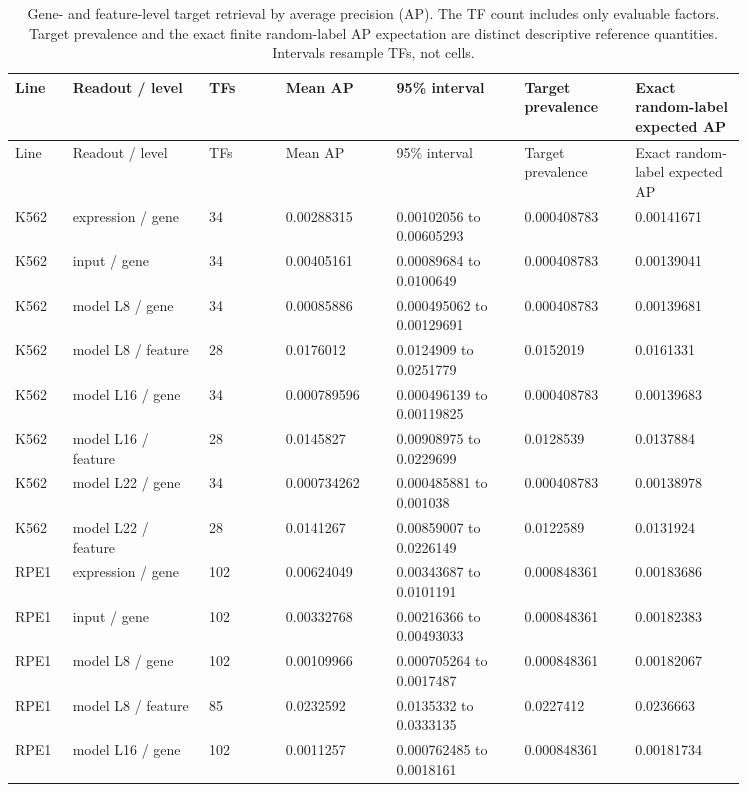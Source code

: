 \begin{longtable}{@{}L{0.06\linewidth}L{0.16\linewidth}L{0.09\linewidth}L{0.13\linewidth}L{0.15\linewidth}L{0.13\linewidth}L{0.13\linewidth}@{}}
\caption{Gene- and feature-level target retrieval by average precision (AP). The TF count includes only evaluable factors. Target prevalence and the exact finite random-label AP expectation are distinct descriptive reference quantities. Intervals resample TFs, not cells.}\\
\toprule
Line & Readout / level & TFs & Mean AP & 95\% interval & Target prevalence & Exact random-label expected AP \\
\midrule
\endfirsthead
\toprule
Line & Readout / level & TFs & Mean AP & 95\% interval & Target prevalence & Exact random-label expected AP \\
\midrule
\endhead
\endfoot
\bottomrule
\endlastfoot
K562 & expression / gene & 34 & 0.00288315 & 0.00102056 to 0.00605293 & 0.000408783 & 0.00141671 \\
K562 & input / gene & 34 & 0.00405161 & 0.00089684 to 0.0100649 & 0.000408783 & 0.00139041 \\
K562 & model L8 / gene & 34 & 0.00085886 & 0.000495062 to 0.00129691 & 0.000408783 & 0.00139681 \\
K562 & model L8 / feature & 28 & 0.0176012 & 0.0124909 to 0.0251779 & 0.0152019 & 0.0161331 \\
K562 & model L16 / gene & 34 & 0.000789596 & 0.000496139 to 0.00119825 & 0.000408783 & 0.00139683 \\
K562 & model L16 / feature & 28 & 0.0145827 & 0.00908975 to 0.0229699 & 0.0128539 & 0.0137884 \\
K562 & model L22 / gene & 34 & 0.000734262 & 0.000485881 to 0.001038 & 0.000408783 & 0.00138978 \\
K562 & model L22 / feature & 28 & 0.0141267 & 0.00859007 to 0.0226149 & 0.0122589 & 0.0131924 \\
RPE1 & expression / gene & 102 & 0.00624049 & 0.00343687 to 0.0101191 & 0.000848361 & 0.00183686 \\
RPE1 & input / gene & 102 & 0.00332768 & 0.00216366 to 0.00493033 & 0.000848361 & 0.00182383 \\
RPE1 & model L8 / gene & 102 & 0.00109966 & 0.000705264 to 0.0017487 & 0.000848361 & 0.00182067 \\
RPE1 & model L8 / feature & 85 & 0.0232592 & 0.0135332 to 0.0333135 & 0.0227412 & 0.0236663 \\
RPE1 & model L16 / gene & 102 & 0.0011257 & 0.000762485 to 0.0018161 & 0.000848361 & 0.00181734 \\

\end{longtable}
